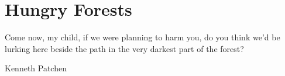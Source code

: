 \chapter{Hungry Forests}
\epigraph{Come now, my child, if we were planning to harm you, do you think we'd be lurking here beside the path in the very darkest part of the forest?}{Kenneth Patchen}

